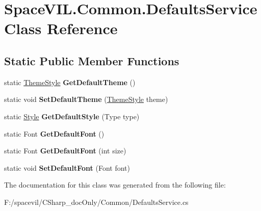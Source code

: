 \hypertarget{class_space_v_i_l_1_1_common_1_1_defaults_service}{}\section{Space\+V\+I\+L.\+Common.\+Defaults\+Service Class Reference}
\label{class_space_v_i_l_1_1_common_1_1_defaults_service}
\subsection*{Static Public Member Functions}
\begin{DoxyCompactItemize}
\item 
\mbox{\label{class_space_v_i_l_1_1_common_1_1_defaults_service_a3a1ecb31e06ae45e0a9227e75e01399a}} 
static \mbox{\hyperlink{class_space_v_i_l_1_1_decorations_1_1_theme_style}{Theme\+Style}} {\bfseries Get\+Default\+Theme} ()
\item 
\mbox{\label{class_space_v_i_l_1_1_common_1_1_defaults_service_a43290acf17a972ce91eb936af1c541cd}} 
static void {\bfseries Set\+Default\+Theme} (\mbox{\hyperlink{class_space_v_i_l_1_1_decorations_1_1_theme_style}{Theme\+Style}} theme)
\item 
\mbox{\label{class_space_v_i_l_1_1_common_1_1_defaults_service_aac89ec24d0e9edab0b72dcde86d913c2}} 
static \mbox{\hyperlink{class_space_v_i_l_1_1_decorations_1_1_style}{Style}} {\bfseries Get\+Default\+Style} (Type type)
\item 
\mbox{\label{class_space_v_i_l_1_1_common_1_1_defaults_service_ae24a361853bf1783b4004f40d109ccd4}} 
static Font {\bfseries Get\+Default\+Font} ()
\item 
\mbox{\label{class_space_v_i_l_1_1_common_1_1_defaults_service_a0eeff6b97557d037caf36448ac6fbf9b}} 
static Font {\bfseries Get\+Default\+Font} (int size)
\item 
\mbox{\label{class_space_v_i_l_1_1_common_1_1_defaults_service_aced0d6886a373392fdd102221fae8d0e}} 
static void {\bfseries Set\+Default\+Font} (Font font)
\end{DoxyCompactItemize}


The documentation for this class was generated from the following file\+:\begin{DoxyCompactItemize}
\item 
F\+:/spacevil/\+C\+Sharp\+\_\+doc\+Only/\+Common/Defaults\+Service.\+cs\end{DoxyCompactItemize}
